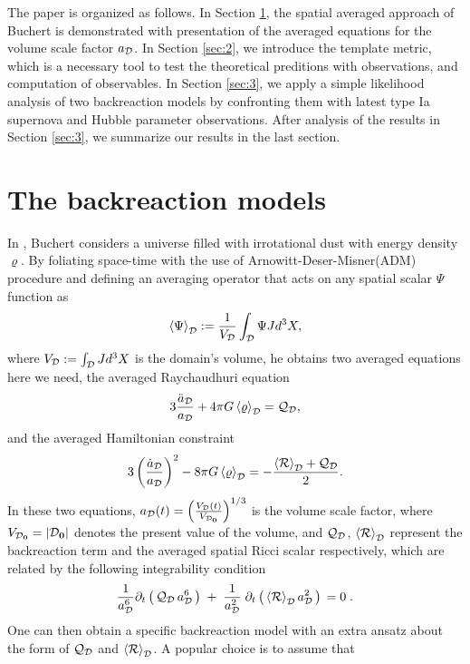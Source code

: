 \documentclass[preprint,preprintnumbers, prd, floatfix,  superscriptaddress,nofootinbib] {revtex4-1}
\newcommand{\CD}{{\cal D}}
\newcommand{\CR}{{\cal R}}
\newcommand{\CQ}{{\cal Q}}
\newcommand{\average}[1]{\left\langle #1 \right\rangle_\CD}
\newcommand{\now}[1]{{#1_{\rm \bf 0}}}
\begin{document}
The paper is organized as follows. In Section \ref{sec:1}, the spatial averaged approach of Buchert is demonstrated with presentation of the averaged equations for the volume scale factor $a_\CD$. In Section \ref{sec:2}, we introduce the template metric, which is a necessary tool to test the theoretical preditions with observations, and computation of observables. In Section \ref{sec:3}, we apply a simple likelihood analysis of two backreaction models by confronting them with latest type Ia supernova and Hubble parameter observations. After analysis of the results in Section \ref{sec:3}, we summarize our
results in the last section.

\section{The backreaction models}
\label{sec:1}
In \cite{buchert2000average}, Buchert considers a universe filled with irrotational dust with energy density $\varrho$. By foliating space-time with the use of Arnowitt-Deser-Misner(ADM) procedure and defining an averaging operator that acts on any spatial scalar $\Psi$ function as
\begin{equation}
\average{\Psi}:=\frac{1}{V_{\CD}}\int_{\CD}\Psi Jd^{3}X,
\end{equation}
where $V_{\CD}:=\int_{\CD}Jd^{3}X$ is the domain's volume, he obtains two averaged equations here we need, the averaged Raychaudhuri equation
\begin{equation}
3\frac{{\ddot a}_\CD}{a_\CD} + 4\pi G \average{\varrho} ={\CQ}_\CD,
\end{equation}
and the averaged Hamiltonian constraint
\begin{equation}
3\left( \frac{{\dot a}_\CD}{a_\CD}\right)^2 - 8\pi G \average{\varrho}= - \frac{\average{\CR}+{\CQ}_\CD }{2}.
\end{equation}
In these two equations, $a_\CD(t) = \left(\frac{V_\CD (t)}{V_{\now\CD}}\right)^{1/3}$ is the volume scale factor, where $V_{\now\CD} =\vert{\now\CD}\vert$ denotes the present value of the volume, and ${\cal Q}_\CD$, $\average{\CR}$  represent the backreaction term and the averaged spatial Ricci scalar respectively, which are related by the following integrability condition
\begin{equation}
\frac{1}{a_\CD^6}\partial_t \left(\,{\CQ}_\CD \,a_\CD^6 \,\right)
\;+\; \frac{1}{a_\CD^{2}} \;\partial_t \left(\,\average{\CR}a_\CD^2 \,
\right)\,=0\;.
\end{equation}
One can then obtain a specific backreaction model with an extra ansatz about the form of ${\cal Q}_\CD$ and $\average{\CR}$. A popular choice is to assume that
\end{document}
